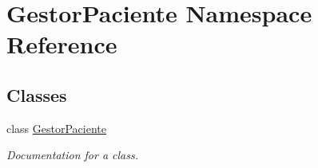 \hypertarget{namespace_gestor_paciente}{}\section{Gestor\+Paciente Namespace Reference}
\label{namespace_gestor_paciente}
\subsection*{Classes}
\begin{DoxyCompactItemize}
\item 
class \mbox{\hyperlink{class_gestor_paciente_1_1_gestor_paciente}{Gestor\+Paciente}}
\begin{DoxyCompactList}\small\item\em Documentation for a class. \end{DoxyCompactList}\end{DoxyCompactItemize}
